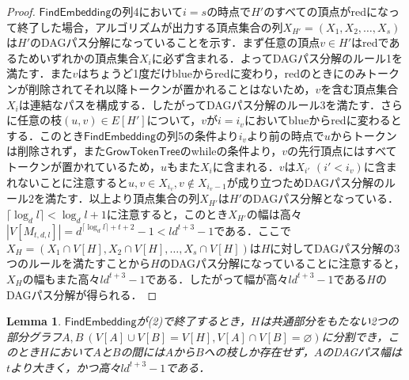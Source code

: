 \documentclass[master]{kuisthesis}		%
\theoremstyle{plain}
\newtheorem{lemma}{Lemma}
\theoremstyle{definition}
\begin{document}
\begin{proof}
    $\mathsf{FindEmbedding}$の列4において$i=s$の時点で$H'$のすべての頂点がredになって終了した場合，アルゴリズムが出力する頂点集合の列$X_{H'} = (X_1, X_2, \dots , X_s)$は$H'$のDAGパス分解になっていることを示す．まず任意の頂点$v \in H'$はredであるためいずれかの頂点集合$X_i$に必ず含まれる．よってDAGパス分解のルール1を満たす．また$v$はちょうど1度だけblueからredに変わり，redのときにのみトークンが削除されてそれ以降トークンが置かれることはないため，$v$を含む頂点集合$X_i$は連結なパスを構成する．したがってDAGパス分解のルール3を満たす．さらに任意の枝$(u, v) \in E[H']$について，$v$が$i=i_v$においてblueからredに変わるとする．このとき$\mathsf{FindEmbedding}$の列5の条件より$i_v$より前の時点で$u$からトークンは削除されず，また$\mathsf{GrowTokenTree}$のwhileの条件より，$v$の先行頂点にはすべてトークンが置かれているため，$u$もまた$X_i$に含まれる．$v$は$X_{i'}$ $(i' < i_v)$に含まれないことに注意すると$u, v \in X_{i_v}, v \notin X_{i_v-1}$が成り立つためDAGパス分解のルール2を満たす．以上より頂点集合の列$X_{H'}$は$H'$のDAGパス分解となっている．$\lceil \log_d l \rceil < \log_d l +1$に注意すると，このとき$X_{H'}$の幅は高々$|V[M_{t, d, l}]| = d^{\lceil \log_d l \rceil +t+2}-1 < ld^{t+3}-1$である．ここで$X_H = (X_1 \cap V[H], X_2 \cap V[H], \dots , X_s \cap V[H])$は$H$に対してDAGパス分解の3つのルールを満たすことから$H$のDAGパス分解になっていることに注意すると，$X_H$の幅もまた高々$ld^{t+3}-1$である．したがって幅が高々$ld^{t+3}-1$である$H$のDAGパス分解が得られる．
\end{proof}



\begin{lemma}\label{lemma_(2)}
    $\mathsf{FindEmbedding}$が(2)で終了するとき，$H$は共通部分をもたない2つの部分グラフ$A, B\ (V[A] \cup V[B] = V[H], V[A] \cap V[B] = \varnothing)$に分割でき，このとき$H$において$A$と$B$の間には$A$から$B$への枝しか存在せず，$A$のDAGパス幅は$t$より大きく，かつ高々$ld^{t+3}-1$である．
\end{lemma}
\end{document}

